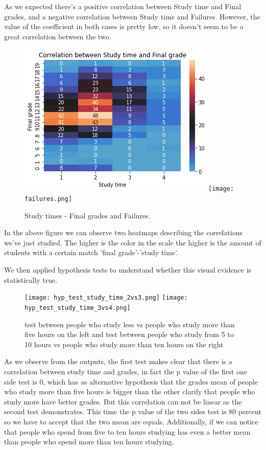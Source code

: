 \documentclass[a4paper, 11pt]{report}
\theoremstyle{definition}
\numberwithin{equation}{section}		%
\numberwithin{figure}{section}			%
\numberwithin{table}{section}				%
\begin{document}
\begin{itemize}
As we expected there's a positive correlation between Study time and Final grades, and a negative correlation between Study time and Failures. However, the value of the coefficient in both cases is pretty low, so it doesn't seem to be a great correlation between the two. 

\begin{figure}[h]\centering
\includegraphics[scale=0.42]{g3-st.png}\quad\texttt{[image: failures.png]}
\caption{Study times - Final grades and Failures.}
\end{figure}

In the above figure we can observe two heatmaps describing the correlations we've just studied. The higher is the color in the scale the higher is the amount of students with a certain match 'final grade'-'study time'.

We then applied hypothesis tests to understand whether this visual evidence 
is statistically true.

\begin{figure}[h]\centering
\texttt{[image: hyp\_test\_study\_time\_2vs3.png]}
\texttt{[image: hyp\_test\_study\_time\_3vs4.png]}
\caption{test between people who study less vs people who study more than five hours on the left and test between people who study from 5 to 10 hours
vs people who study more than ten hours on the right}
\end{figure}

As we observe from the outputs, the first test makes clear that there is a
correlation between study time and grades, in fact the p value of the first 
one side test is 0, which has as alternative hypothesis that the grades mean of people who study more than five hours is bigger than the other clarify that people who study more have better grades.  But this correlation can not
be linear as the second test demonstrates. This time the p value of the two
sides test is 80 percent so we have to accept that the two mean are equals. 
Additionally, if we can notice that people who spend from five to ten hours 
studying has even a better mean than people who spend more than ten hours 
studying.



\end{itemize}
\end{document}
